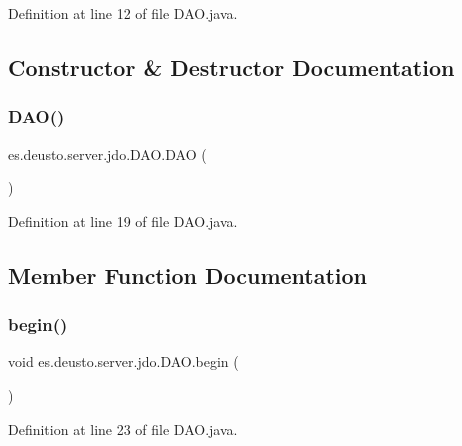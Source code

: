 Definition at line 12 of file D\+A\+O.\+java.



\subsection{Constructor \& Destructor Documentation}
\mbox{\label{classes_1_1deusto_1_1server_1_1jdo_1_1_d_a_o_a6b7d3b6555e4f370d347919a33620607}} 
\subsubsection{\texorpdfstring{DAO()}{DAO()}}
{\footnotesize\ttfamily es.\+deusto.\+server.\+jdo.\+D\+A\+O.\+D\+AO (\begin{DoxyParamCaption}{ }\end{DoxyParamCaption})}



Definition at line 19 of file D\+A\+O.\+java.



\subsection{Member Function Documentation}
\mbox{\label{classes_1_1deusto_1_1server_1_1jdo_1_1_d_a_o_ad923bb21c8273dabc601b85713703c89}} 
\subsubsection{\texorpdfstring{begin()}{begin()}}
{\footnotesize\ttfamily void es.\+deusto.\+server.\+jdo.\+D\+A\+O.\+begin (\begin{DoxyParamCaption}{ }\end{DoxyParamCaption})}



Definition at line 23 of file D\+A\+O.\+java.

